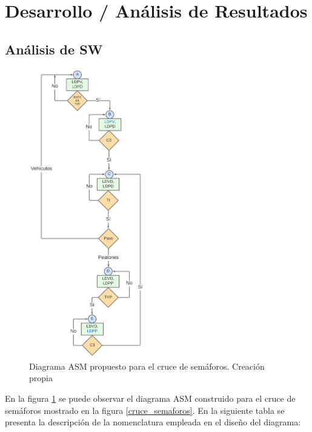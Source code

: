 \section{Desarrollo / Análisis de Resultados}
\subsection{Análisis de SW}
\begin{figure}[H]
    \centering
    \includegraphics[width=0.45\textwidth]{images/diagrama_asm.png}
    \caption{Diagrama ASM propuesto para el cruce de semáforos. Creación propia}
    \label{diagrama_asm}
\end{figure}

En la figura \ref{diagrama_asm} se puede observar el diagrama ASM construido para el cruce de semáforos mostrado en la figura \ref{cruce_semaforos}. En la siguiente tabla se presenta la descripción de la nomenclatura empleada en el diseño del diagrama: 


